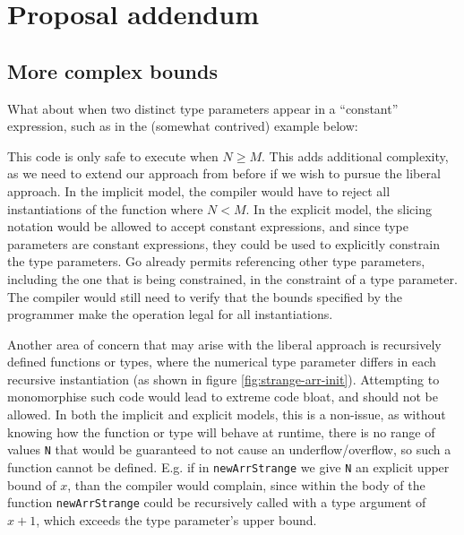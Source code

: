 \section{Proposal addendum}

\subsection{More complex  bounds}
\label{sec:proposal-appx-bounds}

What about when two distinct type parameters appear in a
``constant'' expression, such as in the (somewhat contrived) example below:


This code is only safe to execute when $N \ge M$. This adds additional
complexity, as we need to extend our approach from before if we wish to pursue
the liberal approach. In the implicit model, the compiler would have to reject
all instantiations of the function where $N < M$. In the explicit model, the
slicing notation would be allowed to accept constant expressions, and since type
parameters are constant expressions, they could be used to explicitly constrain
the type parameters. Go already permits referencing other type parameters,
including the one that is being constrained, in the constraint of a type
parameter. The compiler would still need to verify that the bounds specified by
the programmer make the operation legal for all instantiations.


Another area of concern that may arise with the liberal approach is recursively
defined functions or types, where the numerical type parameter differs in each
recursive instantiation (as shown in figure \ref{fig:strange-arr-init}).
Attempting to monomorphise such code would lead to extreme code bloat, and
should not be allowed. In both the implicit and explicit models, this is a
non-issue, as without knowing how the function or type will behave at runtime,
there is no range of values \texttt{N} that would be guaranteed to not cause an
underflow/overflow, so such a function cannot be defined. E.g. if in
\texttt{newArrStrange} we give \texttt{N} an explicit upper bound of $x$, than
the compiler would complain, since within the body of the function
\texttt{newArrStrange} could be recursively called with a type argument of $x +
    1$, which exceeds the type parameter's upper bound.

